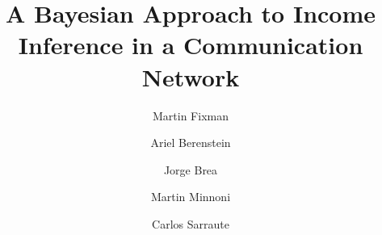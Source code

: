 



\title{A Bayesian Approach to Income Inference in a Communication Network}

\author[1,2]{Martin Fixman}
\author[1]{Ariel Berenstein}
\author[1]{Jorge Brea}
\author[1]{Martin Minnoni}
\author[1]{Carlos Sarraute}


\maketitle

\begin{abstract}
	
\end{abstract}










{}


